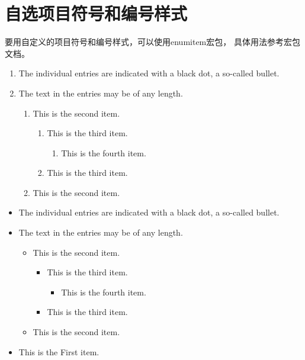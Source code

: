\documentclass[a4paper, 12pt]{book}
\begin{document}
\section{自选项目符号和编号样式}
要用自定义的项目符号和编号样式，可以使用enumitem宏包，
具体用法参考宏包文档。
\begin{enumerate}
    \item The individual entries are indicated with a black dot, a so-called bullet.
    \item The text in the entries may be of any length.
        \begin{enumerate}
            \item This is the second item.
                \begin{enumerate}
                    \item This is the third item.
                        \begin{enumerate}
                            \item This is the fourth item.
                        \end{enumerate}
                    \item This is the third item.
                \end{enumerate}
            \item This is the second item.
        \end{enumerate}
\end{enumerate}

\begin{itemize}
    \item The individual entries are indicated with a black dot, a so-called bullet.
    \item The text in the entries may be of any length.
        \begin{itemize}
            \item This is the second item.
                \begin{itemize}
                    \item This is the third item.
                        \begin{itemize}
                            \item This is the fourth item.
                        \end{itemize}
                    \item This is the third item.
                \end{itemize}
            \item This is the second item.
        \end{itemize}
    \item This is the First item.
\end{itemize}
\end{document}
